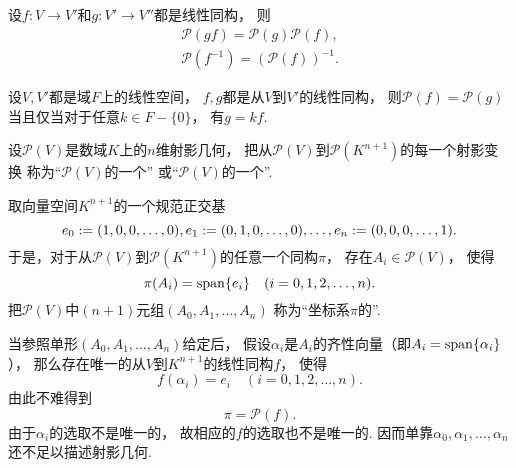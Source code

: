 \begin{property}%
设\(f\colon V \to V'\)和\(g\colon V' \to V''\)都是线性同构，
则\begin{gather*}
	\mathcal{P}(gf) = \mathcal{P}(g) \mathcal{P}(f), \\
	\mathcal{P}(f^{-1}) = (\mathcal{P}(f))^{-1}.
\end{gather*}
\end{property}

\begin{theorem}%
设\(V,V'\)都是域\(F\)上的线性空间，
\(f,g\)都是从\(V\)到\(V'\)的线性同构，
则\(\mathcal{P}(f) = \mathcal{P}(g)\)
当且仅当对于任意\(k \in F - \{0\}\)，
有\(g = k f\).
\end{theorem}

\begin{definition}
设\(\mathcal{P}(V)\)是数域\(K\)上的\(n\)维射影几何，
把从\(\mathcal{P}(V)\)到\(\mathcal{P}(K^{n+1})\)的每一个射影变换
称为“\(\mathcal{P}(V)\)的一个”
或“\(\mathcal{P}(V)\)的一个”.
\end{definition}

取向量空间\(K^{n+1}\)的一个规范正交基\begin{equation*}
	e_0 := (1,0,0,\dotsc,0),
	e_1 := (0,1,0,\dotsc,0),
	\dotsc,
	e_n := (0,0,0,\dotsc,1).
\end{equation*}
于是，对于从\(\mathcal{P}(V)\)到\(\mathcal{P}(K^{n+1})\)的任意一个同构\(\pi\)，
存在\(A_i \in \mathcal{P}(V)\)，
使得\begin{equation*}
	\pi(A_i) = \operatorname{span}\{e_i\}
	\quad(i=0,1,2,\dotsc,n).
\end{equation*}
把\(\mathcal{P}(V)\)中\((n+1)\)元组\((A_0,A_1,\dotsc,A_n)\)
称为“坐标系\(\pi\)的”.

当参照单形\((A_0,A_1,\dotsc,A_n)\)给定后，
假设\(\alpha_i\)是\(A_i\)的齐性向量（即\(A_i = \operatorname{span}\{\alpha_i\}\)），
那么存在唯一的从\(V\)到\(K^{n+1}\)的线性同构\(f\)，
使得\begin{equation*}
	f(\alpha_i) = e_i
	\quad(i=0,1,2,\dotsc,n).
\end{equation*}
由此不难得到\begin{equation*}
	\pi = \mathcal{P}(f).
\end{equation*}
由于\(\alpha_i\)的选取不是唯一的，
故相应的\(f\)的选取也不是唯一的.
因而单靠\(\alpha_0,\alpha_1,\dotsc,\alpha_n\)还不足以描述射影几何.

